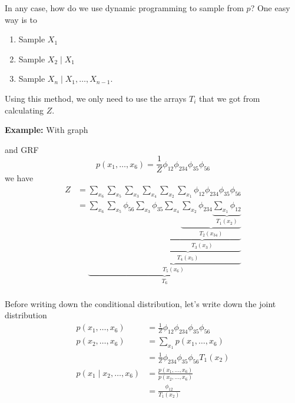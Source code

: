 \documentclass[12pt]{report}
\newcommand*{\tbf}[1]{\ifmmode\mathbf{#1}\else\textbf{#1}\fi}
\begin{document}
In any case, how do we use dynamic programming to sample from $p$? One easy way is to
\begin{enumerate}
    \item Sample $X_1$
    \item Sample $X_2 \; | \; X_1$
    \item Sample $X_n \; | \; X_1, \dots, X_{n-1}$.
\end{enumerate}

Using this method, we only need to use the arrays $T_i$ that we got from calculating $Z$.

\tbf{Example:} With graph
\begin{center}
\end{center}
and GRF
\[p(x_1, \dots, x_6) = \frac{1}{Z} \phi_{12} \phi_{234} \phi_{35} \phi_{56}\]
we have
\begin{align*}
    Z & = \sum_{x_6} \sum_{x_5} \sum_{x_3} \sum_{x_4} \sum_{x_2} \sum_{x_1} \phi_{12} \phi_{234} \phi_{35} \phi_{56}                                                                                                                                                 \\
      & = \underbrace{\sum_{x_6} \underbrace{\sum_{x_5} \phi_{56} \underbrace{\sum_{x_3} \phi_{35} \underbrace{\sum_{x_4} \underbrace{\sum_{x_2} \phi_{234} \underbrace{\sum_{x_1} \phi_{12}}_{T_1(x_2)}}_{T_2(x_{34})}}_{T_3(x_{3})}}_{T_4(x_5)}}_{T_5(x_6)}}_{T_6} \\
\end{align*}

Before writing down the conditional distribution, let's write down the joint distribution
\begin{align*}
    p(x_1, \dots, x_6)             & = \frac{1}{Z} \phi_{12} \phi_{234} \phi_{35} \phi_{56} \\
    p(x_2, \dots, x_6)             & = \sum_{x_1} p(x_1, \dots, x_6)                        \\
                                   & = \frac{1}{Z} \phi_{234} \phi_{35} \phi_{56} T_1(x_2)  \\
    p(x_1 \; | \; x_2, \dots, x_6) & = \frac{p(x_1, \dots, x_6)}{p(x_2, \dots, x_6)}        \\
                                   & = \frac{\phi_{12}}{T_1(x_2)}
\end{align*}
\end{document}
